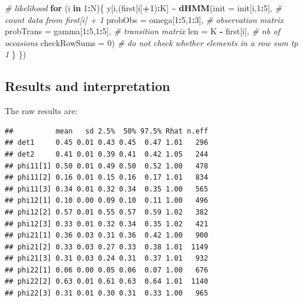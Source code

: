 \documentclass[
  12pt,
]{krantz}
\newenvironment{Shaded}{\begin{snugshade}}{\end{snugshade}}
\newcommand{\AttributeTok}[1]{\textcolor[rgb]{0.13,0.29,0.53}{#1}}
\newcommand{\CommentTok}[1]{\textcolor[rgb]{0.56,0.35,0.01}{\textit{#1}}}
\newcommand{\ControlFlowTok}[1]{\textcolor[rgb]{0.13,0.29,0.53}{\textbf{#1}}}
\newcommand{\DecValTok}[1]{\textcolor[rgb]{0.00,0.00,0.81}{#1}}
\newcommand{\FunctionTok}[1]{\textcolor[rgb]{0.13,0.29,0.53}{\textbf{#1}}}
\newcommand{\NormalTok}[1]{#1}
\newcommand{\SpecialCharTok}[1]{\textcolor[rgb]{0.81,0.36,0.00}{\textbf{#1}}}
\begin{document}
\begin{Shaded}
\begin{Highlighting}[]
  \CommentTok{\# likelihood }
  \ControlFlowTok{for}\NormalTok{ (i }\ControlFlowTok{in} \DecValTok{1}\SpecialCharTok{:}\NormalTok{N)\{}
\NormalTok{    y[i,(first[i]}\SpecialCharTok{+}\DecValTok{1}\NormalTok{)}\SpecialCharTok{:}\NormalTok{K] }\SpecialCharTok{\textasciitilde{}} \FunctionTok{dHMM}\NormalTok{(}\AttributeTok{init =}\NormalTok{ init[i,}\DecValTok{1}\SpecialCharTok{:}\DecValTok{5}\NormalTok{],           }\CommentTok{\# count data from first[i] + 1}
                               \AttributeTok{probObs =}\NormalTok{ omega[}\DecValTok{1}\SpecialCharTok{:}\DecValTok{5}\NormalTok{,}\DecValTok{1}\SpecialCharTok{:}\DecValTok{3}\NormalTok{],     }\CommentTok{\# observation matrix}
                               \AttributeTok{probTrans =}\NormalTok{ gamma[}\DecValTok{1}\SpecialCharTok{:}\DecValTok{5}\NormalTok{,}\DecValTok{1}\SpecialCharTok{:}\DecValTok{5}\NormalTok{],   }\CommentTok{\# transition matrix}
                               \AttributeTok{len =}\NormalTok{ K }\SpecialCharTok{{-}}\NormalTok{ first[i],           }\CommentTok{\# nb of occasions}
                               \AttributeTok{checkRowSums =} \DecValTok{0}\NormalTok{)             }\CommentTok{\# do not check whether elements in a row sum tp 1}
\NormalTok{  \}}
\NormalTok{\})}
\end{Highlighting}
\end{Shaded}

\subsection{Results and interpretation}\label{results-and-interpretation-4}

The raw results are:

\begin{verbatim}
##          mean   sd 2.5%  50% 97.5% Rhat n.eff
## det1     0.45 0.01 0.43 0.45  0.47 1.01   296
## det2     0.41 0.01 0.39 0.41  0.42 1.05   244
## phi11[1] 0.50 0.01 0.49 0.50  0.52 1.00   478
## phi11[2] 0.16 0.01 0.15 0.16  0.17 1.01   834
## phi11[3] 0.34 0.01 0.32 0.34  0.35 1.00   565
## phi12[1] 0.10 0.00 0.09 0.10  0.11 1.00   496
## phi12[2] 0.57 0.01 0.55 0.57  0.59 1.02   382
## phi12[3] 0.33 0.01 0.32 0.34  0.35 1.02   421
## phi21[1] 0.36 0.03 0.31 0.36  0.42 1.00   900
## phi21[2] 0.33 0.03 0.27 0.33  0.38 1.01  1149
## phi21[3] 0.31 0.03 0.24 0.31  0.37 1.01   932
## phi22[1] 0.06 0.00 0.05 0.06  0.07 1.00   676
## phi22[2] 0.63 0.01 0.61 0.63  0.64 1.01  1140
## phi22[3] 0.31 0.01 0.30 0.31  0.33 1.00   965
\end{verbatim}
\end{document}
